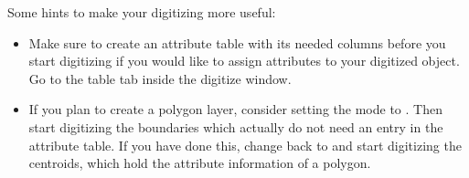 Some hints to make your digitizing more useful:
\begin{itemize}
\item Make sure to create an attribute table with its needed columns before you start digitizing
if you would like to assign attributes to your digitized object. 
Go to the table tab inside the digitize window.
\item If you plan to create a polygon layer, consider setting the mode to . 
Then start digitizing the boundaries which actually do not need an entry in the attribute table. 
If you have done this, change back to  and start digitizing the centroids, which 
hold the attribute information of a polygon.

\end{itemize}

